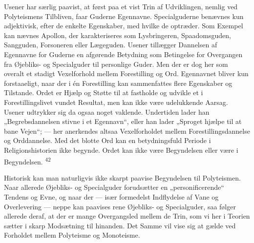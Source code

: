 \documentclass[12pt,a4paper,openany]{book}
\newcommand{\opage}[1]{\marginnote{\footnotesize\textit{[#1]}}}
\begin{document}
Usener har særlig paavist, at først paa et vist Trin af Udviklingen,
nemlig ved Polyteismens Tilbliven, faar Guderne Egennavne.
Specialguderne benævnes kun adjektivisk, efter de enkelte Egenskaber,
med hvilke de optræder. Som Exempel kan nævnes Apollon, der
karakteriseres som Lysbringeren, Spaadomsguden, Sangguden, Forsoneren
eller Lægeguden. Usener tillægger Dannelsen af Egennavne for Guderne en
afgørende Betydning som Betingelse for Overgangen fra Øjebliks- og
Specialguder til personlige Guder. Men der er dog her som overalt et
stadigt Vexelforhold mellem Forestilling og Ord. Egennavnet bliver kun
forstaaeligt, naar der i én Forestilling kan sammenfattes flere
Egenskaber og Tilstande. Ordet er Hjælp og Støtte til at fastholde og
udvikle et i Forestillingslivet vundet Resultat, men kan ikke være
\opage{95}udelukkende Aarsag. Usener udtrykker sig da ogsaa noget
vaklende. Undertiden lader han „Begrebsdannelsen stivne i et Egennavn“,
eller han lader „Sproget hjælpe til at bane Vejen“; --- her anerkendes
altsaa Vexelforholdet mellem Forestillingsdannelse og Orddannelse. Med
det blotte Ord kan en betydningsfuld Periode i Religionshistorien ikke
begynde. Ordet kan ikke være Begyndelsen eller være i Begyndelsen.
\textsuperscript{42}

Historisk kan man naturligvis ikke skarpt paavise Begyndelsen til
Polyteismen. Naar allerede Øjebliks- og Specialguder forudsætter en
„personificerende“ Tendens og Evne, og naar der --- især formedelst
Indflydelse af Vane og Overlevering --- neppe kan paavises rene
Øjebliks- og Specialguder, saa følger allerede deraf, at der er mange
Overgangsled mellem de Trin, som vi her i Teorien sætter i skarp
Modsætning til hinanden. Det Samme vil vise sig at gælde ved Forholdet
mellem Polyteisme og Monoteisme.
\end{document}
